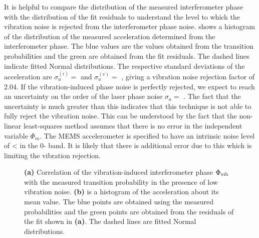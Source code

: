 \par\noindent
It is helpful to compare the distribution of the measured interferometer phase with
the distribution of the fit residuals to understand the level to
which the vibration noise is rejected from the interferometer phase
noise.  shows a histogram of the
distribution of the measured acceleration determined from the
interferometer phase. The blue values are the values obtained from
the transition probabilities and the green are obtained from the
fit residuals. The dashed lines indicate fitted Normal
distributions. The respective standard deviations of the acceleration
are $\sigma_a^{(i)} =$  and
$\sigma_a^{(v)} = $ , giving a vibration
noise rejection factor of 2.04. If the vibration-induced phase noise
is perfectly rejected, we expect to reach an uncertainty on the order
of the laser phase noise $\sigma_a =$ .
The fact that the uncertainty is much greater than this indicates that
this technique is not able to fully reject the vibration noise. This
can be understood by the fact that the non-linear least-squares method
assumes that there is no error in the independent variable
$\Phi_{m}$. The MEMS accelerometer is specified to
have an intrinsic noise level of <  in the
0- band. It is likely that there is additional error
due to this which is limiting the vibration
rejection.\nocite{Macdonald1992} 
\begin{figure}[htpb!]
  \centering
  \caption[MEMS/Interferometer correlation in a
    low vibration
    environment.]{\textbf{(a)} Correlation of the vibration-induced interferometer
    phase $\Phi_\textnormal{vib}$ with the measured transition
    probability in the presence of low vibration noise. \textbf{(b)}
    is a histogram of the acceleration about its mean value. The blue
    points are obtained using the measured probabilities and the green
    points are obtained from the residuals of the fit shown in
    \textbf{(a)}. The dashed lines are fitted Normal distributions.}
  \label{fig:vib_comparison}
\end{figure}
